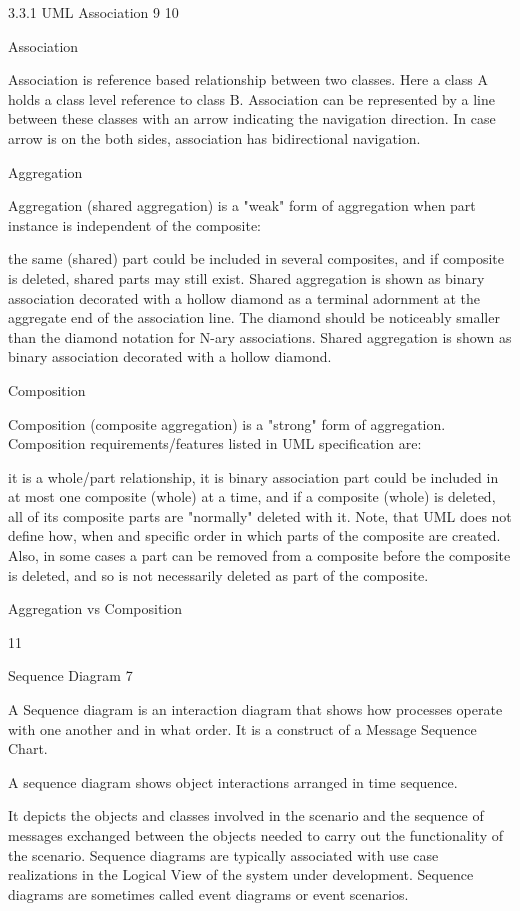 3.3.1 UML Association 9 10


Association

Association is reference based relationship between two classes. Here a class A holds a class level reference to class B. Association can be represented by a line between these classes with an arrow indicating the navigation direction. In case arrow is on the both sides, association has bidirectional navigation.



Aggregation

Aggregation (shared aggregation) is a "weak" form of aggregation when part instance is independent of the composite:

the same (shared) part could be included in several composites, and
if composite is deleted, shared parts may still exist.
Shared aggregation is shown as binary association decorated with a hollow diamond as a terminal adornment at the aggregate end of the association line. The diamond should be noticeably smaller than the diamond notation for N-ary associations. Shared aggregation is shown as binary association decorated with a hollow diamond.



Composition

Composition (composite aggregation) is a "strong" form of aggregation. Composition requirements/features listed in UML specification are:

it is a whole/part relationship,
it is binary association
part could be included in at most one composite (whole) at a time, and
if a composite (whole) is deleted, all of its composite parts are "normally" deleted with it.
Note, that UML does not define how, when and specific order in which parts of the composite are created. Also, in some cases a part can be removed from a composite before the composite is deleted, and so is not necessarily deleted as part of the composite.



Aggregation vs Composition

11



Sequence Diagram
7

A Sequence diagram is an interaction diagram that shows how processes operate with one another and in what order. It is a construct of a Message Sequence Chart.

A sequence diagram shows object interactions arranged in time sequence.

It depicts the objects and classes involved in the scenario and the sequence of messages exchanged between the objects needed to carry out the functionality of the scenario. Sequence diagrams are typically associated with use case realizations in the Logical View of the system under development. Sequence diagrams are sometimes called event diagrams or event scenarios.



